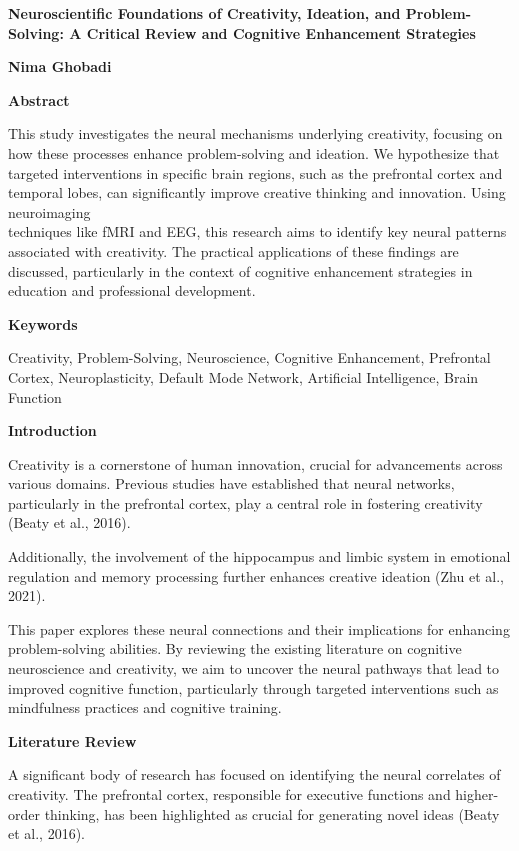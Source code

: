 \documentclass[
]{article}
\author{}
\date{}
\begin{document}
\textbf{Neuroscientific Foundations of Creativity, Ideation, and
Problem-Solving: A Critical Review and Cognitive Enhancement Strategies}

\textbf{Nima Ghobadi}

\textbf{Abstract}

This study investigates the neural mechanisms underlying creativity,
focusing on how these processes enhance problem-solving and ideation. We
hypothesize that targeted interventions in specific brain regions, such
as the prefrontal cortex and temporal lobes, can significantly improve
creative thinking and innovation. Using neuroimaging\\
techniques like fMRI and EEG, this research aims to identify key neural
patterns associated with creativity. The practical applications of these
findings are discussed, particularly in the context of cognitive
enhancement strategies in education and professional development.

\textbf{Keywords}

Creativity, Problem-Solving, Neuroscience, Cognitive Enhancement,
Prefrontal Cortex, Neuroplasticity, Default Mode Network, Artificial
Intelligence, Brain Function

\textbf{Introduction}

Creativity is a cornerstone of human innovation, crucial for
advancements across various domains. Previous studies have established
that neural networks, particularly in the prefrontal cortex, play a
central role in fostering creativity (Beaty et al., 2016).

Additionally, the involvement of the hippocampus and limbic system in
emotional regulation and memory processing further enhances creative
ideation (Zhu et al., 2021).

This paper explores these neural connections and their implications for
enhancing problem-solving abilities. By reviewing the existing
literature on cognitive neuroscience and creativity, we aim to uncover
the neural pathways that lead to improved cognitive function,
particularly through targeted interventions such as mindfulness
practices and cognitive training.

\textbf{Literature Review}

A significant body of research has focused on identifying the neural
correlates of creativity. The prefrontal cortex, responsible for
executive functions and higher-order thinking, has been highlighted as
crucial for generating novel ideas (Beaty et al., 2016).
\end{document}
